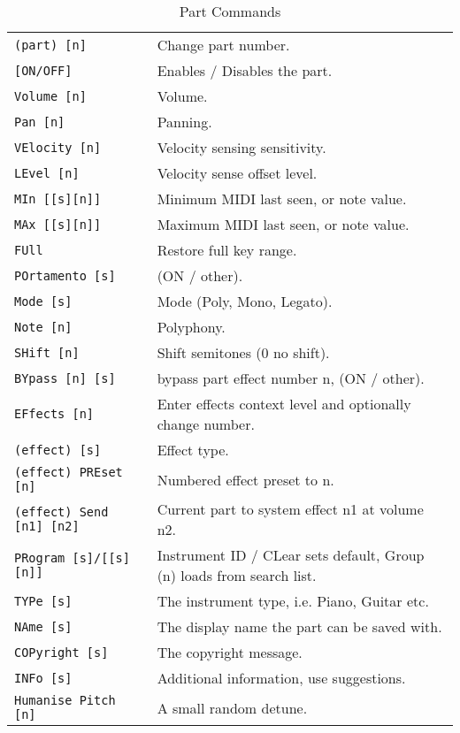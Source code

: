    \begin{table}[H]
      \centering
      \caption{Part Commands}
      \label{table:yoshimi_part_commands}
      \begin{tabular}{l l}
\texttt{(part) [n]} &
   Change part number.  \\
\texttt{[ON/OFF]} &
   Enables / Disables the part. \\
\texttt{Volume [n]} &
   Volume.  \\
\texttt{Pan [n]} &
   Panning.\\
\texttt{VElocity [n]} &
   Velocity sensing sensitivity. \\
\texttt{LEvel [n]} &
   Velocity sense offset level.  \\
\texttt{MIn [[s][n]]} &
   Minimum MIDI last seen, or note value.   \\
\texttt{MAx [[s][n]]} &
   Maximum MIDI last seen, or note value.   \\
\texttt{FUll} &
   Restore full key range.   \\
\texttt{POrtamento [s]} &
   (ON / other).   \\
\texttt{Mode [s]} &
   Mode (Poly, Mono, Legato). \\
\texttt{Note [n]} &
   Polyphony.  \\
\texttt{SHift [n]} &
   Shift semitones (0 no shift). \\
\texttt{BYpass [n] [s]} &
   bypass part effect number n, (ON / other).  \\
\texttt{EFfects [n]} &
   Enter effects context level and optionally change number.  \\
 \texttt{(effect) [s]} &
   Effect type.   \\
 \texttt{(effect) PREset [n]} &
   Numbered effect preset to n. \\
 \texttt{(effect) Send [n1] [n2]} &
   Current part to system effect n1 at volume n2. \\
\texttt{PRogram [s]/[[s] [n]]} &
   Instrument ID / CLear sets default, Group (n) loads from search list. \\
\texttt{TYPe [s]} &
   The instrument type, i.e. Piano, Guitar etc. \\
\texttt{NAme [s]} &
   The display name the part can be saved with. \\
\texttt{COPyright [s]} &
   The copyright message. \\
\texttt{INFo [s]} &
   Additional information, use suggestions. \\
\texttt{Humanise Pitch [n]} &
   A small random detune. \\

\end{tabular}
\end{table}
